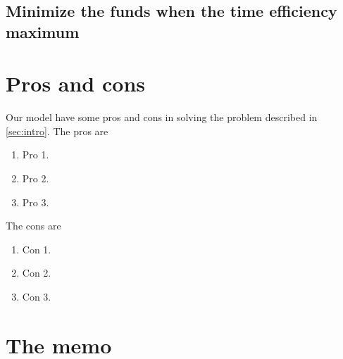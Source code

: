 \documentclass{article}
\begin{document}
\subsection{Minimize the funds when the time efficiency maximum}


\section{Pros and cons}
Our model have some pros and cons in solving the problem described in \ref{sec:intro}.
The pros are
\begin{enumerate}
\item Pro 1.
\item Pro 2.
\item Pro 3.
\end{enumerate}

The cons are
\begin{enumerate}
\item Con 1.
\item Con 2.
\item Con 3.
\end{enumerate}


\newpage

\section{The memo}
\label{sec:memo}
\end{document}
